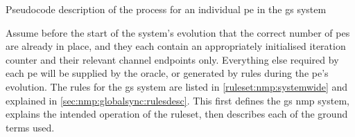 \begin{algorithm}
\DontPrintSemicolon
{}
\caption[Pseudocode of the  process in the \gls{gs} system]{\label{alg:nmp:systemwide2}Pseudocode description of the process for an individual \gls{pe} in the \gls{gs} system}
\end{algorithm}

Assume before the start of the system's evolution that the correct number of \glspl{pe} are already in place, and they each contain an appropriately initialised iteration counter and their relevant channel endpoints only.  Everything else required by each \gls{pe} will be supplied by the oracle, or generated by rules during the \gls{pe}'s evolution.  The rules for the \gls{gs} system are listed in \cref{ruleset:nmp:systemwide} and explained in \cref{sec:nmp:globalsync:rulesdesc}.  This  first defines the \gls{gs} \gls{nmp} system, explains the intended operation of the \gls{ruleset}, then describes each of the ground terms used.

